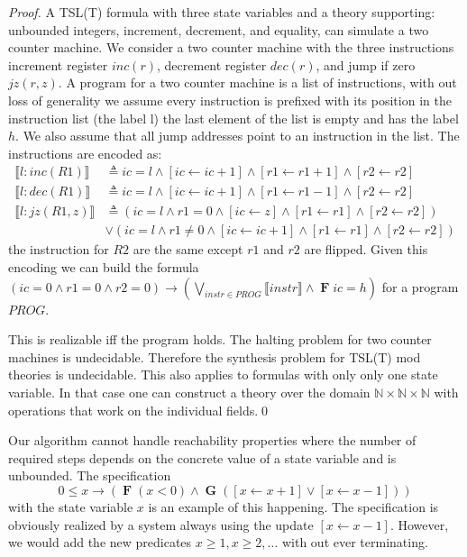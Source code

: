 \documentclass[runningheads]{llncs}
\newcommand{\eventually}{\operatorname{\mathbf{F}}}
\newcommand{\globally}{\operatorname{\mathbf{G}}}
\newcommand{\rarrow}{\boldsymbol{\rightarrow}}
\begin{document}
\begin{proof}
A TSL(T) formula with three state variables and a theory supporting: unbounded integers, increment, decrement, and equality, can simulate a two counter machine. We consider a two counter machine \cite{minsky1967} with the three instructions increment register $inc(r)$, decrement register $dec(r)$, and jump if zero $jz(r,z)$.
A program for a two counter machine is a list of instructions, with out loss of generality we assume every instruction is prefixed with its position in the instruction list (the label l) the last element of the list is empty and has the label $h$. We also assume that all jump addresses point to an instruction in the list.
The instructions are encoded as:
\begin{align*}
\llbracket l:inc(R1) \rrbracket &\triangleq ic = l \land [ic \leftarrow ic + 1] \land [r1 \leftarrow r1 + 1] \land [r2 \leftarrow r2]\\
\llbracket l:dec(R1) \rrbracket &\triangleq ic = l \land [ic \leftarrow ic + 1] \land [r1 \leftarrow r1 - 1] \land [r2 \leftarrow r2]\\
\llbracket l:jz(R1,z) \rrbracket &\triangleq (ic = l \land r1=0 \land [ic \leftarrow z] \land [r1 \leftarrow r1] \land [r2 \leftarrow r2])\\ 
&\lor (ic = l \land r1\neq0 \land [ic \leftarrow ic +1] \land [r1 \leftarrow r1] \land [r2 \leftarrow r2])
\end{align*}
the instruction for $R2$ are the same except $r1$ and $r2$ are flipped.
Given this encoding we can build the formula
$
(ic = 0 \land r1 = 0 \land r2 = 0) \rightarrow ( \bigvee_{instr \in PROG} \llbracket instr \rrbracket \land \eventually ic = h )
$
for a program $PROG$.

This is realizable iff the program holds. 
The halting problem for two counter machines is undecidable.
Therefore the synthesis problem for TSL(T) mod theories is undecidable.
This also applies to formulas with only only one state variable.
In that case one can construct a theory over the domain $\mathbb{N}\times\mathbb{N}\times\mathbb{N}$ with operations that work on the individual fields.\qed
\end{proof}

Our algorithm cannot handle reachability properties where the number of required steps depends on the concrete value of a state variable and is unbounded. The specification 
$$0 \leq x \rarrow (\eventually (x<0) \land \globally ( [x \leftarrow x+1] \lor [x \leftarrow x-1] ))$$
with the state variable $x$ is an example of this happening.
The specification is obviously realized by a system always using the update $[x \leftarrow x-1]$.
However, we would add the new predicates $x\geq1, x\geq2, \ldots$ with out ever terminating.
\end{document}
